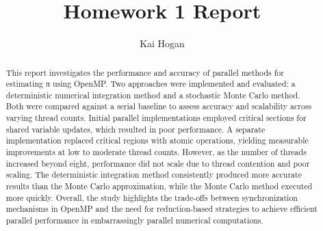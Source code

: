\documentclass[acmtog]{acmart}
\begin{document}
\title{Homework 1 Report}

\author{Kai Hogan}



\renewcommand{\shortauthors}{Hogan}

\begin{abstract}
This report investigates the performance and accuracy of parallel methods for estimating π using OpenMP. Two approaches were implemented and evaluated: a deterministic numerical integration method and a stochastic Monte Carlo method. Both were compared against a serial baseline to assess accuracy and scalability across varying thread counts. Initial parallel implementations employed critical sections for shared variable updates, which resulted in poor performance. A separate implementation replaced critical regions with atomic operations, yielding measurable improvements at low to moderate thread counts. However, as the number of threads increased beyond eight, performance did not scale due to thread contention and poor scaling. The deterministic integration method consistently produced more accurate results than the Monte Carlo approximation, while the Monte Carlo method executed more quickly. Overall, the study highlights the trade-offs between synchronization mechanisms in OpenMP and the need for reduction-based strategies to achieve efficient parallel performance in embarrassingly parallel numerical computations.
\end{abstract}
\end{document}
